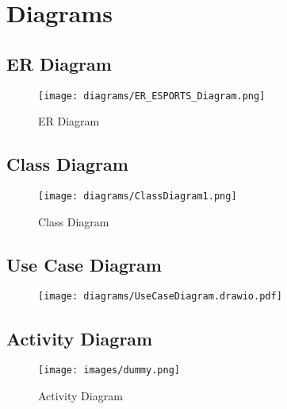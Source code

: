 \chapter{Diagrams}
\hrulefill


\section{ER Diagram}
\begin{figure}[h]
    \centering
    \texttt{[image: diagrams/ER\_ESPORTS\_Diagram.png]}
    \caption{ER Diagram}
    \label{fig:ER Diagram}
\end{figure}

\clearpage
\section{Class Diagram}
\hrulefill
\begin{figure}[H]
    \centering
    \texttt{[image: diagrams/ClassDiagram1.png]}
    \caption{Class Diagram}
    \label{fig:Class Diagram}
\end{figure}

\clearpage
\section{Use Case Diagram}
\hrulefill
\begin{figure}[h]
    \centering
    \vspace{3cm}
    \texttt{[image: diagrams/UseCaseDiagram.drawio.pdf]}
    \label{fig:Use Case Diagram}
\end{figure}

\clearpage

\section{Activity Diagram}

\begin{figure}[h]
    \centering
    \texttt{[image: images/dummy.png]}
    \caption{Activity Diagram}
    \label{fig:Activity Diagram}
\end{figure}

\clearpage

